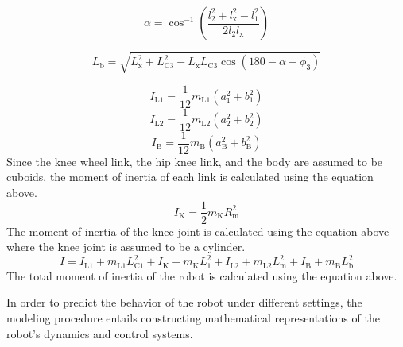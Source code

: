    \begin{equation}
        \alpha = \cos^{-1} \left( \frac{l_{\mathrm{2}}^2 + l_{\mathrm{x}}^2 - l_{\mathrm{1}}^2}{2 l_{\mathrm{2}} l_{\mathrm{x}}} \right)
    \end{equation}

    \begin{equation}
        L_{\mathrm{b}} = \sqrt{L_{\mathrm{x}}^2 + L_{\mathrm{C3}}^2 - L_{\mathrm{x}} L_{\mathrm{C3}} \cos(180 - \alpha - \phi_{\mathrm{3}})}
    \end{equation}

    \begin{equation}
        I_{\mathrm{L1}} = \frac{1}{12} m_{\mathrm{L1}} (a_{\mathrm{1}}^2 + b_{\mathrm{1}}^2)
    \end{equation}
    \begin{equation}
        I_{\mathrm{L2}} = \frac{1}{12} m_{\mathrm{L2}} (a_{\mathrm{2}}^2 + b_{\mathrm{2}}^2)
    \end{equation}
    \begin{equation}
        I_{\mathrm{B}} = \frac{1}{12} m_{\mathrm{B}} (a_{\mathrm{B}}^2 + b_{\mathrm{B}}^2)
    \end{equation}
    Since the knee wheel link, the hip knee link, and the body are assumed to be cuboids, the moment of inertia of each link is calculated using the equation above.
    \begin{equation}
        I_{\mathrm{K}} = \frac{1}{2} m_{\mathrm{K}} R_{\mathrm{m}}^2
    \end{equation}
    The moment of inertia of the knee joint is calculated using the equation above where the knee joint is assumed to be a cylinder.
    \begin{equation}
        I = I_{\mathrm{L1}} + m_{\mathrm{L1}} L_{\mathrm{C1}}^2 + I_{\mathrm{K}} + m_{\mathrm{K}} L_{\mathrm{1}}^2 + I_{\mathrm{L2}} + m_{\mathrm{L2}} L_{\mathrm{m}}^2 + I_{\mathrm{B}} + m_{\mathrm{B}} L_{\mathrm{b}}^2
    \end{equation}
    The total moment of inertia of the robot is calculated using the equation above.

	In order to predict the behavior of the robot under different settings, the modeling procedure entails constructing mathematical representations of the robot's dynamics and control systems.







